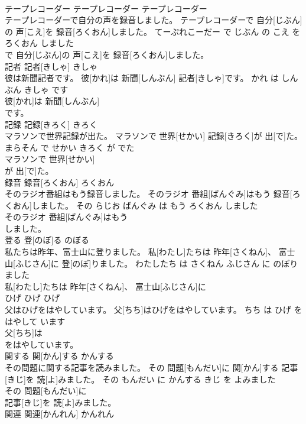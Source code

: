 \documentclass[8pt]{extreport}
\begin{document}
\begin{CJK}{UTF8}{min}
\\	テープレコーダー	テープレコーダー	テープレコーダー	
\\	テープレコーダーで自分の声を録音しました。	テープレコーダーで 自分[じぶん]の 声[こえ]を 録音[ろくおん]しました。	てーぷれこーだー で じぶん の こえ を ろくおん しました	
\\	で 自分[じぶん]の 声[こえ]を 録音[ろくおん]しました。		
\\	記者	記者[きしゃ]	きしゃ	
\\	彼は新聞記者です。	彼[かれ]は 新聞[しんぶん] 記者[きしゃ]です。	かれ は しんぶん きしゃ です	
\\	彼[かれ]は 新聞[しんぶん]
\\	です。		
\\	記録	記録[きろく]	きろく	
\\	マラソンで世界記録が出た。	マラソンで 世界[せかい] 記録[きろく]が 出[で]た。	まらそん で せかい きろく が でた	
\\	マラソンで 世界[せかい]
\\	が 出[で]た。		
\\	録音	録音[ろくおん]	ろくおん	
\\	そのラジオ番組はもう録音しました。	そのラジオ 番組[ばんぐみ]はもう 録音[ろくおん]しました。	その らじお ばんぐみ は もう ろくおん しました	
\\	そのラジオ 番組[ばんぐみ]はもう
\\	しました。		
\\	登る	登[のぼ]る	のぼる	
\\	私たちは昨年、富士山に登りました。	私[わたし]たちは 昨年[さくねん]、 富士山[ふじさん]に 登[のぼ]りました。	わたしたち は さくねん ふじさん に のぼりました	
\\	私[わたし]たちは 昨年[さくねん]、 富士山[ふじさん]に
\\	ひげ	ひげ	ひげ	
\\	父はひげをはやしています。	父[ちち]はひげをはやしています。	ちち は ひげ を はやして います	
\\	父[ちち]は
\\	をはやしています。		
\\	関する	関[かん]する	かんする	
\\	その問題に関する記事を読みました。	その 問題[もんだい]に 関[かん]する 記事[きじ]を 読[よ]みました。	その もんだい に かんする きじ を よみました	
\\	その 問題[もんだい]に
\\	記事[きじ]を 読[よ]みました。		
\\	関連	関連[かんれん]	かんれん	

\end{CJK}
\end{document}
